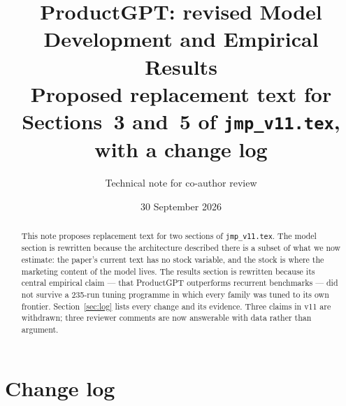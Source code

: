 \documentclass[11pt]{article}
\title{\textbf{ProductGPT: revised Model Development and Empirical Results}\\[3pt]
\large Proposed replacement text for Sections~3 and~5 of \texttt{jmp\_v11.tex},
with a change log}
\author{Technical note for co-author review}
\date{30 September 2026}
\newcommand{\drop}[1]{\textcolor{red!60!black}{#1}}
\begin{document}
\maketitle

\begin{abstract}
\noindent This note proposes replacement text for two sections of
\texttt{jmp\_v11.tex}. The model section is rewritten because the architecture
described there is a subset of what we now estimate: the paper's current text
has no stock variable, and the stock is where the marketing content of the model
lives. The results section is rewritten because its central empirical claim ---
that ProductGPT outperforms recurrent benchmarks --- did not survive a
235-run tuning programme in which every family was tuned to its own frontier.
Section~\ref{sec:log} lists every change and its evidence. Three claims in v11
are \drop{withdrawn}; three reviewer comments are now answerable with data rather
than argument.
\end{abstract}

\section{Change log}\label{sec:log}
\end{document}
